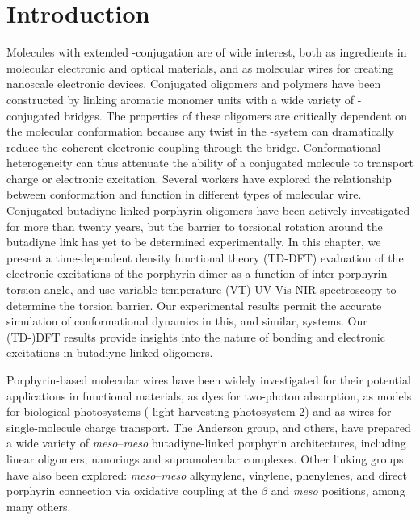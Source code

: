 
\section{Introduction}
	Molecules with extended \pii-conjugation are of wide interest, both as ingredients in molecular electronic and optical materials,\autocite{Roncali1997,Pron2010} and as molecular wires for creating nanoscale electronic devices.\autocite{Tour2000,Carroll2002,Robertson2003,Metzger2015} Conjugated oligomers and polymers have been constructed by linking aromatic monomer units with a wide variety of \pii-conjugated bridges.\autocite{Martin1999} The properties of these oligomers are critically dependent on the molecular conformation because any twist in the \pii-system can dramatically reduce the coherent electronic coupling through the bridge. Conformational heterogeneity can thus attenuate the ability of a conjugated molecule to transport charge or electronic excitation. Several workers have explored the relationship between conformation and function in different types of molecular wire.\autocite{Martin1999,Davis2001,Yoshida2003,Venkataraman2006,Ahn2006,Chang2008,Kocherzhenko2012,Sun2014,Gilbert2015} Conjugated butadiyne-linked porphyrin oligomers have been actively investigated for more than twenty years,\autocite{Arnold1978,Arnold1992,Lin1994,Anderson1994,Lin1995} but the barrier to torsional rotation around the butadiyne link has yet to be determined experimentally. In this chapter, we present a time-dependent density functional theory (TD-DFT) evaluation of the electronic excitations of the porphyrin dimer as a function of inter-porphyrin torsion angle, and use variable temperature (VT) UV-Vis-NIR spectroscopy to determine the torsion barrier. Our experimental results permit the accurate simulation of conformational dynamics in this, and similar, systems. Our (TD-)DFT results provide insights into the nature of bonding and electronic excitations in butadiyne-linked oligomers.

	Porphyrin-based molecular wires have been widely investigated for their potential applications in functional materials,\autocite{Tanaka2015} as dyes for two-photon absorption,\autocite{Collins2008,Wilkinson2014} as models for biological photosystems ( light-harvesting photosystem 2)\autocite{Nakamura2007} and as wires for single-molecule charge transport.\autocite{Sedghi2008,Sedghi2011,Sedghi2012} The Anderson group, and others, have prepared a wide variety of \textit{meso}--\textit{meso} butadiyne-linked porphyrin architectures, including linear oligomers,\autocite{Anderson1994,Lin1995,Taylor1998,Anderson1999} nanorings\autocite{Hoffmann2007,OSullivan2011} and supramolecular complexes.\autocite{Anderson1994,Taylor1999,Sprafke2011a} Other linking groups have also been explored: \textit{meso}--\textit{meso} alkynylene,\autocite{Lin1994} vinylene,\autocite{Frampton2005} phenylenes,\autocite{Lindsey1994,Wagner1995,Pawlicki2012} and direct porphyrin connection via oxidative coupling at the $\beta$ and \textit{meso} positions,\autocite{Tsuda2001} among many others. 

